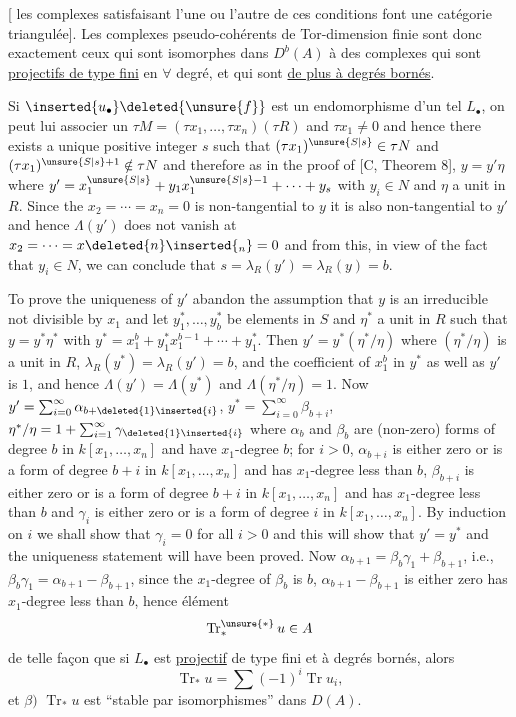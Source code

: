 [ les complexes satisfaisant l'une ou l'autre de ces conditions font  une catégorie triangulée]. Les complexes pseudo-cohérents de Tor-dimension finie sont donc exactement ceux qui sont isomorphes dans $D^b(A)$  à des complexes qui sont \uline{projectifs de type fini} en $\forall$ degré, et qui sont \uline{de plus à degrés bornés}.

Si $\inserted{u_\bullet}\deleted{\unsure{f}}$ est un endomorphisme d'un tel $L_\bullet$, on peut lui associer  un
$\tau M=(\tau x_1,\ldots,\tau x_n)(\tau R)$ and $\tau x_1\ne0$ and hence there exists a unique positive integer $s$ such that $(\tau x_1)^{\unsure{S|s}}\in\tau N$ and $(\tau x_1)^{\unsure{S|s}+1}\notin\tau N$ and therefore as in the proof of [C, Theorem 8],
$y=y'\eta$ where $y'=x_1^{\unsure{S|s}}+y_1x_1^{\unsure{S|s}-1}+\cdots+y_s$ with $y_i\in N$ and $\eta$ a unit in $R$. Since the  $x_2=\cdots=x_n=0$ is non-tangential to $y$ it is also non-tangential to $y'$ and hence $\Lambda(y')$ does not vanish at $x_2=\cdots=x\deleted{n}\inserted{{}_n}=0$ and from this, in view of the fact that $y_i\in N$, we can conclude that $s=\lambda_R(y')=\lambda_R(y)=b$.

To prove the uniqueness of $y'$ abandon the assumption that $y$ is an irreducible not divisible by $x_1$ and let $y_1^*,\ldots,y_b^*$ be elements in $S$ and $\eta^*$ a unit in $R$ such that $y=y^*\eta^*$ with $y^*=x_1^b+y_1^*x_1^{b-1}+\cdots+y_1^*$. Then $y'=y^*(\eta^*/\eta)$ where $(\eta^*/\eta)$ is a unit in $R$, $\lambda_R(y^*)=\lambda_R(y')=b$, and the coefficient of $x_1^b$ in $y^*$ as well as $y'$ is $1$, and hence $\Lambda(y')=\Lambda(y^*)$ and $\Lambda(\eta^*/\eta)=1$. Now $y'=\sum_{i=0}^\infty\alpha_{b+\deleted{1}\inserted{i}}$, $y^*=\sum_{i=0}^\infty\beta_{b+i}$, $\eta^*/\eta=1+\sum_{i=1}^\infty\gamma_{\deleted{1}\inserted{i}}$ where $\alpha_b$ and $\beta_b$ are (non-zero) forms of degree $b$ in $k[x_1,\ldots,x_n]$ and have $x_1$-degree $b$; for $i>0$, $\alpha_{b+i}$ is either zero or is a form of degree $b+i$ in $k[x_1,\ldots,x_n]$ and has $x_1$-degree less than $b$, $\beta_{b+i}$ is either zero or is a form of degree $b+i$ in $k[x_1,\ldots,x_n]$ and has $x_1$-degree less than $b$ and $\gamma_i$ is either zero or is a form of degree $i$ in $k[x_1,\ldots,x_n]$. By induction on $i$ we shall show that $\gamma_i=0$ for all $i>0$ and this will show that $y'=y^*$ and the uniqueness statement will have been proved. Now $\alpha_{b+1}=\beta_b\gamma_1+\beta_{b+1}$, i.e., $\beta_b\gamma_1=\alpha_{b+1}-\beta_{b+1}$, since the $x_1$-degree of $\beta_b$ is $b$, $\alpha_{b+1}-\beta_{b+1}$ is either zero has $x_1$-degree less than $b$, hence
élément
\[
\operatorname{Tr}_{*}^{\unsure{*}}u\in A
\]
de telle façon que \inserted{$\alpha)$} si $L_\bullet$ est \uline{projectif} de type fini et à degrés bornés, alors
\[
\operatorname{Tr}_*u=\sum(-1)^i\operatorname{Tr}u_i,
\]
et $\beta)$ $\operatorname{Tr}_*u$ est ``stable par isomorphismes'' dans $D(A)$.


